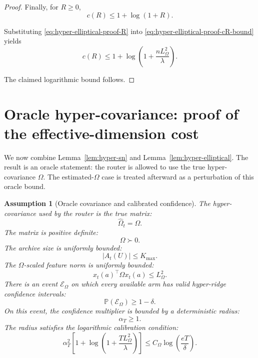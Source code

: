 \documentclass{article} %
\newtheorem{assumption}{Assumption}
\begin{document}
\begin{proof}
Finally, for \(R\ge0\),
\begin{equation}
\label{eq:hyper-elliptical-proof-cR-bound}
c(R)
\le
1+\log(1+R).
\end{equation}

Substituting \eqref{eq:hyper-elliptical-proof-R} into \eqref{eq:hyper-elliptical-proof-cR-bound} yields
\begin{equation}
\label{eq:hyper-elliptical-proof-logT}
c(R)
\le
1+\log\!\left(1+\frac{nL_{\Omega}^2}{\lambda}\right).
\end{equation}

The claimed logarithmic bound follows.
\end{proof}

\section{Oracle hyper-covariance: proof of the effective-dimension cost}
\label{sec:theory-oracle-hyper}

We now combine Lemma~\ref{lem:hyper-sn} and Lemma~\ref{lem:hyper-elliptical}.  The result is an oracle statement: the router is allowed to use the true hyper-covariance \(\Omega\).  The estimated-\(\Omega\) case is treated afterward as a perturbation of this oracle bound.

\begin{assumption}[Oracle covariance and calibrated confidence]
\label{ass:hyper-oracle-calibrated}
The hyper-covariance used by the router is the true matrix:
\begin{equation}
\label{eq:hyper-oracle-omega-known}
\widehat{\Omega}_t=\Omega .
\end{equation}
The matrix is positive definite:
\begin{equation}
\label{eq:hyper-oracle-omega-pd}
\Omega \succ 0 .
\end{equation}
The archive size is uniformly bounded:
\begin{equation}
\label{eq:hyper-oracle-kmax}
|A_t(U)|\le K_{\max}.
\end{equation}
The \(\Omega\)-scaled feature norm is uniformly bounded:
\begin{equation}
\label{eq:hyper-oracle-feature-bound}
x_t(a)^\top\Omega x_t(a)\le L_{\Omega}^{2}.
\end{equation}
There is an event \(\mathcal{E}_{\Omega}\) on which every available arm has valid hyper-ridge confidence intervals:
\begin{equation}
\label{eq:hyper-oracle-event-prob}
\mathbb{P}(\mathcal{E}_{\Omega})\ge 1-\delta .
\end{equation}
On this event, the confidence multiplier is bounded by a deterministic radius:
\begin{equation}
\label{eq:hyper-oracle-alpha}
\alpha_T\ge 1 .
\end{equation}
The radius satisfies the logarithmic calibration condition:
\begin{equation}
\label{eq:hyper-oracle-alpha-log}
\alpha_T^2
\left[
1+\log\!\left(1+\frac{TL_{\Omega}^{2}}{\lambda}\right)
\right]
\le
C_{\Omega}\log\!\left(\frac{eT}{\delta}\right).
\end{equation}
\end{assumption}
\end{document}
